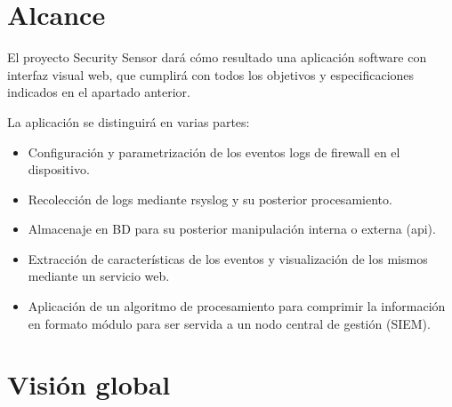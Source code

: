 \section{Alcance}

El proyecto Security Sensor dará cómo resultado una aplicación software con interfaz visual web, que cumplirá con todos los objetivos y especificaciones indicados en el apartado anterior.

La aplicación se distinguirá en varias partes:
\begin{itemize}
\item Configuración y parametrización de los eventos logs de firewall en el dispositivo.
\item Recolección de logs mediante rsyslog y su posterior procesamiento.
\item Almacenaje en BD para su posterior manipulación interna o externa (api).
\item Extracción de características de los eventos y visualización de los mismos mediante un servicio web.
\item Aplicación de un algoritmo de procesamiento para comprimir la información en formato módulo para ser servida a un nodo central de gestión (SIEM).
\end{itemize}

\section{Visión global}

